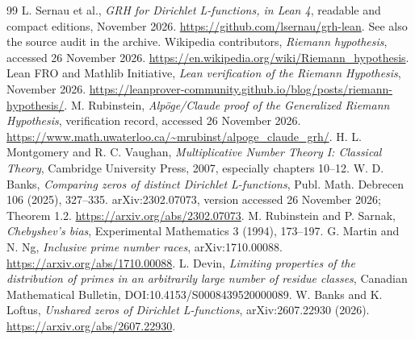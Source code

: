 \documentclass[11pt]{article}
\theoremstyle{remark}\newtheorem{remark}[theorem]{Remark}
\begin{document}
\begin{thebibliography}{99}\small
{} L. Sernau et al., \emph{GRH for Dirichlet L-functions, in Lean 4}, readable and compact editions, November 2026. \url{https://github.com/lsernau/grh-lean}. See also the source audit in the archive.
 Wikipedia contributors, \emph{Riemann hypothesis}, accessed 26 November 2026. \url{https://en.wikipedia.org/wiki/Riemann_hypothesis}.
 Lean FRO and Mathlib Initiative, \emph{Lean verification of the Riemann Hypothesis}, November 2026. \url{https://leanprover-community.github.io/blog/posts/riemann-hypothesis/}.
 M. Rubinstein, \emph{Alp\"oge/Claude proof of the Generalized Riemann Hypothesis}, verification record, accessed 26 November 2026. \url{https://www.math.uwaterloo.ca/~mrubinst/alpoge_claude_grh/}.
 H. L. Montgomery and R. C. Vaughan, \emph{Multiplicative Number Theory I: Classical Theory}, Cambridge University Press, 2007, especially chapters 10--12.
 W. D. Banks, \emph{Comparing zeros of distinct Dirichlet L-functions}, Publ. Math. Debrecen 106 (2025), 327--335. arXiv:2302.07073, version accessed 26 November 2026; Theorem 1.2. \url{https://arxiv.org/abs/2302.07073}.
 M. Rubinstein and P. Sarnak, \emph{Chebyshev's bias}, Experimental Mathematics 3 (1994), 173--197.
 G. Martin and N. Ng, \emph{Inclusive prime number races}, arXiv:1710.00088. \url{https://arxiv.org/abs/1710.00088}.
 L. Devin, \emph{Limiting properties of the distribution of primes in an arbitrarily large number of residue classes}, Canadian Mathematical Bulletin, DOI:10.4153/S0008439520000089.
 W. Banks and K. Loftus, \emph{Unshared zeros of Dirichlet L-functions}, arXiv:2607.22930 (2026). \url{https://arxiv.org/abs/2607.22930}.
\end{thebibliography}
\end{document}
